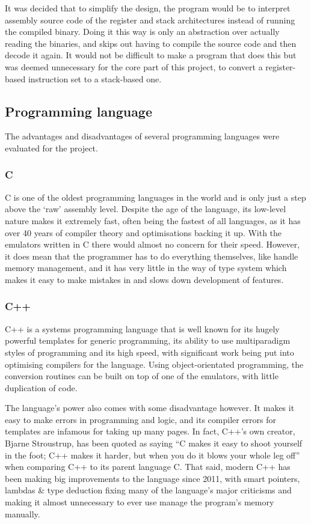 It was decided that to simplify the design, the program would be to
interpret assembly source code of the register and stack architectures instead
of running the compiled binary. Doing it this way is only an abstraction over
actually reading the binaries, and skips out having to compile the source code
and then decode it again. It would not be difficult to make a program that does
this but was deemed unnecessary for the core part of this project, to convert a
register-based instruction set to a stack-based one.

\subsection{Programming language}
The advantages and disadvantages of several programming languages were evaluated
for the project.

\subsubsection{C}
C is one of the oldest programming languages in the world and is only just a
step above the `raw' assembly level. Despite the age of the language, its
low-level nature makes it extremely fast, often being the fastest of all
languages, as it has over 40 years of compiler theory and optimisations backing
it up. With the emulators written in C there would almost no concern for their
speed.  However, it does mean that the programmer has to do everything
themselves, like handle memory management, and it has very little in the way of
type system which makes it easy to make mistakes in and slows down development
of features.

\subsubsection{C++}
C++ is a systems programming language that is well known for its hugely
powerful templates for generic programming, its ability to use multiparadigm
styles of programming and its high speed, with significant work being put into
optimising compilers for the language. Using object-orientated programming, the
conversion routines can be built on top of one of the emulators, with little
duplication of code.

The language's power also comes with some disadvantage however. It makes it easy
to make errors in programming and logic, and its compiler errors for templates
are infamous for taking up many pages. In fact, C++'s own creator, Bjarne
Stroustrup, has been quoted as saying ``C makes it easy to shoot yourself in the
foot; C++ makes it harder, but when you do it blows your whole leg off'' when
comparing C++ to its parent language C. That said, modern C++ has been making
big improvements to the language since 2011, with smart pointers, lambdas \&
type deduction fixing many of the language's major criticisms and making it
almost unnecessary to ever use manage the program's memory manually.

